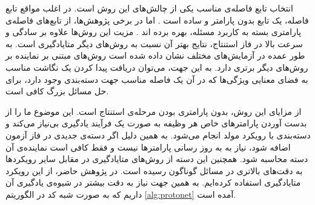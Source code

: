 انتخاب تابع فاصله‌ی مناسب یکی از چالش‌های این روش است. در اغلب مواقع تابع فاصله، یک تابع بدون پارامتر و ساده است
\cite{Liu2020FewShotOR}
.
اما در برخی پژوهش‌ها، از تابع‌های فاصله‌ی پارامتری ‌بسته به کاربرد مسئله، بهره برده اند
\cite{Sung2017LearningTC}
.
مزیت این روش‌ها علاوه بر سادگی و سرعت بالا در فاز استنتاج، نتایج بهتر آن نسبت به روش‌های دیگر متایادگیری است. به طور عمده در آزمایش‌های مختلف نشان داده شده است روش‌های مبتنی بر نماینده بر روش‌های دیگر برتری دارد. به این جهت، می‌توان دریافت پیدا کردن یک نگاشت مناسب به فضای معنایی ویژگی‌ها که در آن یک فاصله مناسب جهت دسته‌بندی وجود دارد، برای حل مسائل بزرگ کافی است.

از مزایای این روش، بدون پارامتری بودن مرحله‌ی استنتاج است. این موضوع ما را از بدست آوردن پارامتر‌های خاص هر وظیفه به صورت یک فرآیند یادگیری بی‌نیاز می‌کند و دسته‌بندی با رویکرد مولد انجام می‌شود. به همین دلیل اگر دسته‌ی جدیدی در فاز آزمون اضافه شود، نیاز به به روز رسانی پارامتر‌ها نیست و فقط کافی است نماینده‌ی آن دسته محاسبه شود. همچنین این دسته از روش‌های متایادگیری در مقابل سایر رویکرد‌ها به دقت‌های بالاتری در مسائل گوناگون رسیده است. در پژوهش حاضر، از این رویکرد متایادگیری استفاده کرده‌ایم. به همین جهت نیاز به دقت بیشتر در شیوه‌ی یادگیری آن داریم که به صورت شبه کد در الگوریتم
\ref{alg:protonet}
 آمده است.

%			
%			
%			
%			


